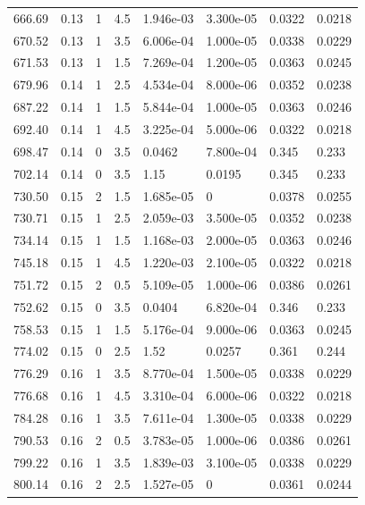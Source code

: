 \documentclass[preview]{standalone}
\begin{document}
{{{\begin{tabular}{L{1.2cm}C{1.2cm} C{0.3cm}C{0.5cm} C{1.4cm}C{1.4cm} C{1.4cm}C{1.4cm}}
  666.69  &  0.13  & 1     & 4.5 &  1.946e-03  & 3.300e-05  & 0.0322 &  0.0218   \\ 
  670.52  &  0.13  & 1     & 3.5 &  6.006e-04  & 1.000e-05  & 0.0338 &  0.0229   \\ 
  671.53  &  0.13  & 1     & 1.5 &  7.269e-04  & 1.200e-05  & 0.0363 &  0.0245   \\ 
  679.96  &  0.14  & 1     & 2.5 &  4.534e-04  & 8.000e-06  & 0.0352 &  0.0238   \\ 
  687.22  &  0.14  & 1     & 1.5 &  5.844e-04  & 1.000e-05  & 0.0363 &  0.0246   \\ 
  692.40  &  0.14  & 1     & 4.5 &  3.225e-04  & 5.000e-06  & 0.0322 &  0.0218   \\ 
  698.47  &  0.14  & 0     & 3.5 &  0.0462  & 7.800e-04  & 0.345 &  0.233   \\ 
  702.14  &  0.14  & 0     & 3.5 &  1.15  & 0.0195  & 0.345 &  0.233   \\ 
  730.50  &  0.15  & 2     & 1.5 &  1.685e-05  & 0  & 0.0378 &  0.0255   \\ 
  730.71  &  0.15  & 1     & 2.5 &  2.059e-03  & 3.500e-05  & 0.0352 &  0.0238   \\ 
  734.14  &  0.15  & 1     & 1.5 &  1.168e-03  & 2.000e-05  & 0.0363 &  0.0246   \\ 
  745.18  &  0.15  & 1     & 4.5 &  1.220e-03  & 2.100e-05  & 0.0322 &  0.0218   \\ 
  751.72  &  0.15  & 2     & 0.5 &  5.109e-05  & 1.000e-06  & 0.0386 &  0.0261   \\ 
  752.62  &  0.15  & 0     & 3.5 &  0.0404  & 6.820e-04  & 0.346 &  0.233   \\ 
  758.53  &  0.15  & 1     & 1.5 &  5.176e-04  & 9.000e-06  & 0.0363 &  0.0245   \\ 
  774.02  &  0.15  & 0     & 2.5 &  1.52  & 0.0257  & 0.361 &  0.244   \\ 
  776.29  &  0.16  & 1     & 3.5 &  8.770e-04  & 1.500e-05  & 0.0338 &  0.0229   \\ 
  776.68  &  0.16  & 1     & 4.5 &  3.310e-04  & 6.000e-06  & 0.0322 &  0.0218   \\ 
  784.28  &  0.16  & 1     & 3.5 &  7.611e-04  & 1.300e-05  & 0.0338 &  0.0229   \\ 
  790.53  &  0.16  & 2     & 0.5 &  3.783e-05  & 1.000e-06  & 0.0386 &  0.0261   \\ 
  799.22  &  0.16  & 1     & 3.5 &  1.839e-03  & 3.100e-05  & 0.0338 &  0.0229   \\ 
  800.14  &  0.16  & 2     & 2.5 &  1.527e-05  & 0  & 0.0361 &  0.0244   \\ 

\end{tabular}}}}
\end{document}
